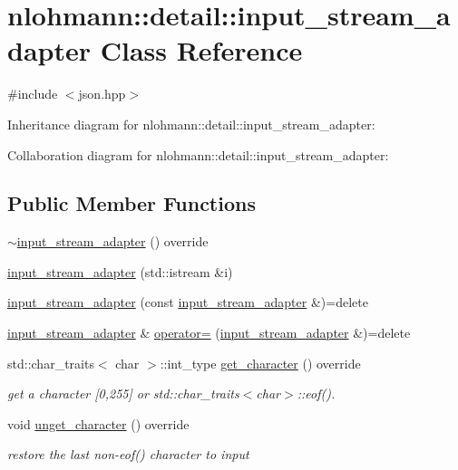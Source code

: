 \hypertarget{classnlohmann_1_1detail_1_1input__stream__adapter}{}\section{nlohmann\+:\+:detail\+:\+:input\+\_\+stream\+\_\+adapter Class Reference}
\label{classnlohmann_1_1detail_1_1input__stream__adapter}


{\ttfamily \#include $<$json.\+hpp$>$}



Inheritance diagram for nlohmann\+:\+:detail\+:\+:input\+\_\+stream\+\_\+adapter\+:


Collaboration diagram for nlohmann\+:\+:detail\+:\+:input\+\_\+stream\+\_\+adapter\+:
\subsection*{Public Member Functions}
\begin{DoxyCompactItemize}
\item 
\hyperlink{classnlohmann_1_1detail_1_1input__stream__adapter_a2d71eb469267abd864f765481d1e823f}{$\sim$input\+\_\+stream\+\_\+adapter} () override
\item 
\hyperlink{classnlohmann_1_1detail_1_1input__stream__adapter_af487152e4606d013eb4ec6a90eaf82ea}{input\+\_\+stream\+\_\+adapter} (std\+::istream \&i)
\item 
\hyperlink{classnlohmann_1_1detail_1_1input__stream__adapter_a5190fe4d0c5ff2e3b348b28ee3bb2218}{input\+\_\+stream\+\_\+adapter} (const \hyperlink{classnlohmann_1_1detail_1_1input__stream__adapter}{input\+\_\+stream\+\_\+adapter} \&)=delete
\item 
\hyperlink{classnlohmann_1_1detail_1_1input__stream__adapter}{input\+\_\+stream\+\_\+adapter} \& \hyperlink{classnlohmann_1_1detail_1_1input__stream__adapter_aeac5048221929b8f7558d1698dd0fb3a}{operator=} (\hyperlink{classnlohmann_1_1detail_1_1input__stream__adapter}{input\+\_\+stream\+\_\+adapter} \&)=delete
\item 
std\+::char\+\_\+traits$<$ char $>$\+::int\+\_\+type \hyperlink{classnlohmann_1_1detail_1_1input__stream__adapter_ae0760af923583de6354725e901d1869d}{get\+\_\+character} () override
\begin{DoxyCompactList}\small\item\em get a character \mbox{[}0,255\mbox{]} or std\+::char\+\_\+traits$<$char$>$\+::eof(). \end{DoxyCompactList}\item 
void \hyperlink{classnlohmann_1_1detail_1_1input__stream__adapter_ab6a65d3816ce4027ef4d2013a13ee697}{unget\+\_\+character} () override
\begin{DoxyCompactList}\small\item\em restore the last non-\/eof() character to input \end{DoxyCompactList}\end{DoxyCompactItemize}
